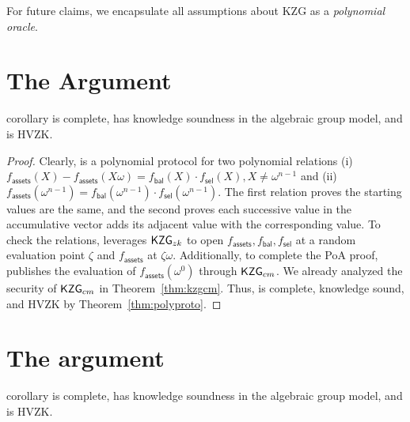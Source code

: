 For future claims, we encapsulate all assumptions about KZG as a \textit{polynomial oracle}. 


\section{The \poa Argument}

\begin{restatable}{corollary}{}
\label{thm:assets} 
\poa is complete, has knowledge soundness in the algebraic group model, and is HVZK. 
\end{restatable}

\begin{proof}
Clearly, \poa is a polynomial protocol for two polynomial relations (i) $f_\mathsf{assets}(X)-f_\mathsf{assets}(X\omega)=f_\mathsf{bal}(X)\cdot{f_\mathsf{sel}}(X),X\ne{\omega^{n-1}}$ and (ii) $f_\mathsf{assets}(\omega^{n-1})=f_\mathsf{bal}(\omega^{n-1})\cdot{f_\mathsf{sel}}(\omega^{n-1})$. The first relation proves the starting values are the same, and the second proves each successive value in the accumulative vector adds its adjacent value with the corresponding value. To check the relations, \poa leverages $\mathsf{KZG}_{zk}$ to open $f_\mathsf{assets},f_\mathsf{bal},f_\mathsf{sel}$ at a random evaluation point $\zeta$ and $f_\mathsf{assets}$ at $\zeta\omega$. Additionally, to complete the PoA proof, \poa publishes the evaluation of $f_\mathsf{assets}(\omega^0)$ through $\mathsf{KZG}_{cm}$. We already analyzed the security of $\mathsf{KZG}_{cm}$ in Theorem~\ref{thm:kzgcm}. Thus, \poa is complete, knowledge sound, and HVZK by Theorem~\ref{thm:polyproto}.
\end{proof}


\section{The \pol argument}

\begin{restatable}{corollary}{}
\label{thm:liabilities} 
\pol is complete, has knowledge soundness in the algebraic group model, and is HVZK. 
\end{restatable}

